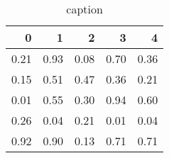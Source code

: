 \begin{table}
\caption{caption}
\label{label}
\begin{tabular}{rrrrr}
\toprule
0 & 1 & 2 & 3 & 4 \\
\midrule
0.21 & 0.93 & 0.08 & 0.70 & 0.36 \\
0.15 & 0.51 & 0.47 & 0.36 & 0.21 \\
0.01 & 0.55 & 0.30 & 0.94 & 0.60 \\
0.26 & 0.04 & 0.21 & 0.01 & 0.04 \\
0.92 & 0.90 & 0.13 & 0.71 & 0.71 \\
\bottomrule
\end{tabular}
\end{table}
